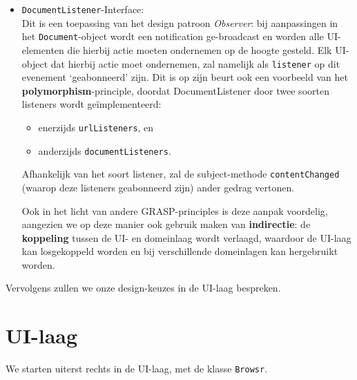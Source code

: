 \documentclass[12pt]{article}
\begin{document}
\begin{itemize}
	\item \texttt{DocumentListener}-Interface:\\
	Dit is een toepassing van het design patroon \textit{Observer}: bij aanpassingen in het \texttt{Document}-object wordt een notification ge-broadcast en worden alle UI-elementen die hierbij actie moeten ondernemen op de hoogte gesteld. Elk UI-object dat hierbij actie moet ondernemen, zal namelijk als \texttt{listener} op dit evenement `geabonneerd' zijn. Dit is op zijn beurt ook een voorbeeld van het \textbf{polymorphism}-principle, doordat DocumentListener door twee soorten listeners wordt geïmplementeerd: 
	\begin{itemize}
		\item enerzijds \texttt{urlListeners}, en 
		\item anderzijds \texttt{documentListeners}.
	\end{itemize} 
	Afhankelijk van het soort listener, zal de subject-methode \texttt{contentChanged} (waarop deze listeners geabonneerd zijn) ander gedrag vertonen.
	
	
	Ook in het licht van andere GRASP-principles is deze aanpak voordelig, aangezien we op deze manier ook gebruik maken van \textbf{indirectie}: de \textbf{koppeling} tussen de UI- en domeinlaag wordt verlaagd, waardoor de UI-laag kan losgekoppeld worden en bij verschillende domeinlagen kan hergebruikt worden.
\end{itemize}

Vervolgens zullen we onze design-keuzes in de UI-laag bespreken.

\section{UI-laag}

We starten uiterst rechts in de UI-laag, met de klasse \texttt{Browsr}.
\end{document}
